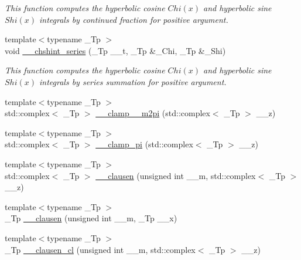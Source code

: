 \begin{DoxyCompactItemize}
\begin{DoxyCompactList}\small\item\em This function computes the hyperbolic cosine $ Chi(x) $ and hyperbolic sine $ Shi(x) $ integrals by continued fraction for positive argument. \end{DoxyCompactList}\item 
{\footnotesize template$<$typename \+\_\+\+Tp $>$ }\\void \hyperlink{namespacestd_1_1____detail_a16055b6e4baa35ffe5c6d9495d9d0158}{\+\_\+\+\_\+chshint\+\_\+series} (\+\_\+\+Tp \+\_\+\+\_\+t, \+\_\+\+Tp \&\+\_\+\+Chi, \+\_\+\+Tp \&\+\_\+\+Shi)
\begin{DoxyCompactList}\small\item\em This function computes the hyperbolic cosine $ Chi(x) $ and hyperbolic sine $ Shi(x) $ integrals by series summation for positive argument. \end{DoxyCompactList}\item 
{\footnotesize template$<$typename \+\_\+\+Tp $>$ }\\std\+::complex$<$ \+\_\+\+Tp $>$ \hyperlink{namespacestd_1_1____detail_a4b52c9c0f24edd3c61c771f55f20002b}{\+\_\+\+\_\+clamp\+\_\+\_\+m2pi} (std\+::complex$<$ \+\_\+\+Tp $>$ \+\_\+\+\_\+z)
\item 
{\footnotesize template$<$typename \+\_\+\+Tp $>$ }\\std\+::complex$<$ \+\_\+\+Tp $>$ \hyperlink{namespacestd_1_1____detail_aa341299d514aa754403a775b9ed51c91}{\+\_\+\+\_\+clamp\+\_\+pi} (std\+::complex$<$ \+\_\+\+Tp $>$ \+\_\+\+\_\+z)
\item 
{\footnotesize template$<$typename \+\_\+\+Tp $>$ }\\std\+::complex$<$ \+\_\+\+Tp $>$ \hyperlink{namespacestd_1_1____detail_a8f7e931e2a93b8d298a4df702a5e41ad}{\+\_\+\+\_\+clausen} (unsigned int \+\_\+\+\_\+m, std\+::complex$<$ \+\_\+\+Tp $>$ \+\_\+\+\_\+z)
\item 
{\footnotesize template$<$typename \+\_\+\+Tp $>$ }\\\+\_\+\+Tp \hyperlink{namespacestd_1_1____detail_a07d0f6b515fec03e423e5cecbb7580cd}{\+\_\+\+\_\+clausen} (unsigned int \+\_\+\+\_\+m, \+\_\+\+Tp \+\_\+\+\_\+x)
\item 
{\footnotesize template$<$typename \+\_\+\+Tp $>$ }\\\+\_\+\+Tp \hyperlink{namespacestd_1_1____detail_ab09b3cb1a96ba96e7fddadd0ea717b1c}{\+\_\+\+\_\+clausen\+\_\+cl} (unsigned int \+\_\+\+\_\+m, std\+::complex$<$ \+\_\+\+Tp $>$ \+\_\+\+\_\+z)
\item 

\end{DoxyCompactItemize}
